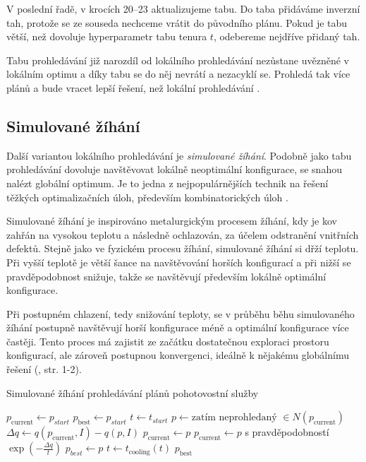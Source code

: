 V poslední řadě, v krocích 20--23 aktualizujeme tabu.
Do taba přidáváme inverzní tah, protože se ze souseda nechceme vrátit do původního plánu.
Pokud je tabu větší, než dovoluje hyperparametr tabu tenura $t$, odebereme nejdříve přidaný tah.

Tabu prohledávání již narozdíl od lokálního prohledávání nezůstane uvězněné v lokálním optimu a díky tabu se do něj nevrátí a nezacyklí se.
Prohledá tak více plánů a bude vracet lepší řešení, než lokální prohledávání \cite{tabu}.

\subsection{Simulované žíhání}

Další variantou lokálního prohledávání je \textit{simulované žíhání}.
Podobně jako tabu prohledávání dovoluje navštěvovat lokálně neoptimální konfigurace, se snahou nalézt globální optimum.
Je to jedna z nejpopulárnějších technik na řešení těžkých optimalizačních úloh, především kombinatorických úloh \cite{siman}.

Simulované žíhání je inspirováno metalurgickým procesem žíhání, kdy je kov zahřán na vysokou teplotu
a následně ochlazován, za účelem odstranění vnitřních defektů.
Stejně jako ve fyzickém procesu žíhání, simulované žíhání si dřží teplotu.
Při vyšší teplotě je větší šance na navštěvování horších konfigurací a při nižší se pravděpodobnost snižuje, takže se navštěvují především lokálně optimální konfigurace.

Při postupném chlazení, tedy snižování teploty, se v průběhu běhu simulovaného žíhání postupně navštěvují horší konfigurace méně a optimální konfigurace více častěji.
Tento proces má zajistit ze začátku dostatečnou exploraci prostoru konfigurací, ale zároveň postupnou konvergenci, ideálně k nějakému globálnímu řešení (\citet{GlovKoch03}, str. 1-2).

\begin{algorithm}[H]
  \caption{Simulované žíhání prohledávání plánů pohotovostní služby}
  \begin{algorithmic}[1]
    \State $p_{\text{current}} \gets p_{start}$
    \State $p_{\text{best}} \gets p_{start}$
    \State $t \gets t_{start}$
        \State $p \gets \text{zatím neprohledaný } \in N(p_{\text{current}})$
        \State $\Delta q \gets q(p_{\text{current}}, I) - q(p, I)$
          \State $p_{\text{current}} \gets p$
        \Else
          \State $p_{\text{current}} \gets p$ s pravděpodobností $\exp\left(-\frac{\Delta q}{t}\right)$
        \EndIf
          \State $p_{best} \gets p$
        \EndIf
      \EndFor
      \State $t \gets t_{\text{cooling}}(t)$
    \EndWhile
    \State \Return $p_{\text{best}}$
    \EndFunction
  \end{algorithmic}
  \label{alg:siman}
\end{algorithm}

